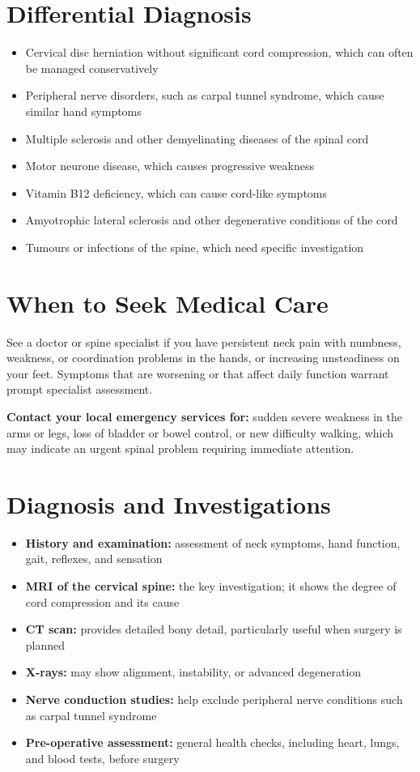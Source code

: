 \section*{Differential Diagnosis}
\begin{itemize}
    \item Cervical disc herniation without significant cord compression, which can often be managed conservatively
    \item Peripheral nerve disorders, such as carpal tunnel syndrome, which cause similar hand symptoms
    \item Multiple sclerosis and other demyelinating diseases of the spinal cord
    \item Motor neurone disease, which causes progressive weakness
    \item Vitamin B12 deficiency, which can cause cord-like symptoms
    \item Amyotrophic lateral sclerosis and other degenerative conditions of the cord
    \item Tumours or infections of the spine, which need specific investigation
\end{itemize}

\section*{When to Seek Medical Care}
See a doctor or spine specialist if you have persistent neck pain with numbness, weakness, or coordination problems in the hands, or increasing unsteadiness on your feet. Symptoms that are worsening or that affect daily function warrant prompt specialist assessment.

\textbf{Contact your local emergency services for:} sudden severe weakness in the arms or legs, loss of bladder or bowel control, or new difficulty walking, which may indicate an urgent spinal problem requiring immediate attention.

\section*{Diagnosis and Investigations}
\begin{itemize}
    \item \textbf{History and examination:} assessment of neck symptoms, hand function, gait, reflexes, and sensation
    \item \textbf{MRI of the cervical spine:} the key investigation; it shows the degree of cord compression and its cause
    \item \textbf{CT scan:} provides detailed bony detail, particularly useful when surgery is planned
    \item \textbf{X-rays:} may show alignment, instability, or advanced degeneration
    \item \textbf{Nerve conduction studies:} help exclude peripheral nerve conditions such as carpal tunnel syndrome
    \item \textbf{Pre-operative assessment:} general health checks, including heart, lungs, and blood tests, before surgery
\end{itemize}

